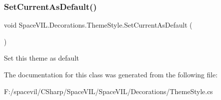 \subsubsection{\texorpdfstring{Set\+Current\+As\+Default()}{SetCurrentAsDefault()}}
{\footnotesize\ttfamily void Space\+V\+I\+L.\+Decorations.\+Theme\+Style.\+Set\+Current\+As\+Default (\begin{DoxyParamCaption}{ }\end{DoxyParamCaption})}



Set this theme as default 



The documentation for this class was generated from the following file\+:\begin{DoxyCompactItemize}
\item 
F\+:/spacevil/\+C\+Sharp/\+Space\+V\+I\+L/\+Space\+V\+I\+L/\+Decorations/Theme\+Style.\+cs\end{DoxyCompactItemize}
